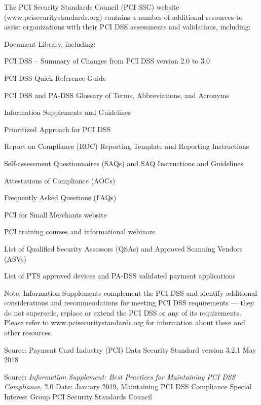 \documentclass[Screen16to9,17pt]{foils}
\begin{document}


The PCI Security Standards Council (PCI SSC) website (www.pcisecuritystandards.org) contains a number of additional resources to assist
organizations with their PCI DSS assessments and validations, including:

\begin{list1}
\item Document Library, including:
\begin{list2}
\item PCI DSS – Summary of Changes from PCI DSS version 2.0 to 3.0
\item PCI DSS Quick Reference Guide
\item PCI DSS and PA-DSS Glossary of Terms, Abbreviations, and Acronyms
\item Information Supplements and Guidelines
\item Prioritized Approach for PCI DSS
\item Report on Compliance (ROC) Reporting Template and Reporting Instructions
\item Self-assessment Questionnaires (SAQs) and SAQ Instructions and Guidelines
\item Attestations of Compliance (AOCs)
\end{list2}

\eject
\item Frequently Asked Questions (FAQs)
\item PCI for Small Merchants website
\item PCI training courses and informational webinars
\item List of Qualified Security Assessors (QSAs) and Approved Scanning Vendors (ASVs)
\item List of PTS approved devices and PA-DSS validated payment applications
\end{list1}
Note: Information Supplements
complement the PCI DSS and identify
additional considerations and
recommendations for meeting PCI DSS
requirements — they do not supersede,
replace or extend the PCI DSS or any of its
requirements.
Please refer to www.pcisecuritystandards.org for information about these and other resources.

Source: Payment Card Industry (PCI)
Data Security Standard version 3.2.1 May 2018




Source:
\emph{Information Supplement:
Best Practices for Maintaining
PCI DSS Compliance}, 2.0
Date: January 2019, Maintaining PCI DSS Compliance Special Interest Group
PCI Security Standards Council
\end{document}
